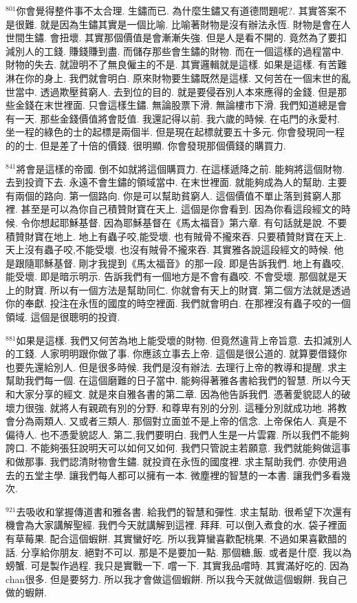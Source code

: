 \documentclass{book}
\begin{document}
$^{801}$你會覺得整件事不太合理.
生鏽而已.
為什麼生鏽又有道德問題呢?.
其實答案不是很難.
就是因為生鏽其實是一個比喻.
比喻著財物是沒有辦法永恆.
財物是會在人世間生鏽.
會扭壞.
其實那個價值是會漸漸失強.
但是人是看不開的.
竟然為了要扣減別人的工錢.
賺錢賺到盡.
而儲存那些會生鏽的財物.
而在一個這樣的過程當中.
財物的失去.
就證明不了無良僱主的不是.
其實邏輯就是這樣.
如果是這樣.
有苦難淋在你的身上.
我們就會明白.
原來財物要生鏽既然是這樣.
又何苦在一個末世的亂世當中.
透過欺壓貧窮人.
去到位的目的.
就是要侵吞別人本來應得的金錢.
但是那些金錢在末世裡面.
只會這樣生鏽.
無論股票下滑.
無論樓市下滑.
我們知道總是會有一天.
那些金錢價值將會貶值.
我還記得以前.
我六歲的時候.
在屯門的永愛村.
坐一程的綠色的士的起標是兩個半.
但是現在起標就要五十多元.
你會發現同一程的的士.
但是差了十倍的價錢.
很明顯.
你會發現那個價錢的購買力.

$^{841}$將會是這樣的帝國.
倒不如就將這個購買力.
在這樣遞降之前.
能夠將這個財物.
去到投資下去.
永遠不會生鏽的領域當中.
在末世裡面.
就能夠成為人的幫助.
主要有兩個的路向.
第一個路向.
你是可以幫助貧窮人.
這個價值不單止落到貧窮人那裡.
甚至是可以為你自己積贊財寶在天上.
這個是你會看到.
因為你看這段經文的時候.
令你想起耶穌基督.
因為耶穌基督在《馬太福音》第六章.
有句話就是說.
不要積贊財寶在地上.
地上有蟲子咬,能受壞.
也有賊骨不攏來吞.
只要積贊財寶在天上.
天上沒有蟲子咬,不能受壞.
也沒有賊骨不攏來吞.
其實雅各說這段經文的時候.
他是跟隨耶穌基督.
剛才我提到《馬太福音》的那一段.
即是告訴我們.
地上有蟲咬,能受壞.
即是暗示明示.
告訴我們有一個地方是不會有蟲咬.
不會受壞.
那個就是天上的財寶.
所以有一個方法是幫助同仁.
你就會有天上的財寶.
第二個方法就是透過你的奉獻.
投注在永恆的國度的時空裡面.
我們就會明白.
在那裡沒有蟲子咬的一個領域.
這個是很聰明的投資.

$^{881}$如果是這樣.
我們又何苦為地上能受壞的財物.
但竟然違背上帝旨意.
去扣減別人的工錢.
人家明明跟你做了事.
你應該立事去上帝.
這個是很公道的.
就算要借錢你也要先還給別人.
但是很多時候.
我們是沒有辦法.
去理行上帝的教導和提醒.
求主幫助我們每一個.
在這個磨難的日子當中.
能夠得著雅各書給我們的智慧.
所以今天和大家分享的經文.
就是來自雅各書的第二章.
因為他告訴我們.
憑著愛貌認人的破壞力很強.
就將人有親疏有別的分野.
和尊卑有別的分別.
這種分別就成功地.
將教會分為兩類人.
又或者三類人.
那個對立面並不是上帝的信念.
上帝保佑人.
真是不偏待人.
也不憑愛貌認人.
第二,我們要明白.
我們人生是一片雲霧.
所以我們不能夠誇口.
不能夠張狂說明天可以如何又如何.
我們只管說主若願意.
我們就能夠做這事和做那事.
我們認清財物會生鏽.
就投資在永恆的國度裡.
求主幫助我們.
亦使用過去的五堂主學.
讓我們每人都可以擁有一本.
微塵裡的智慧的一本書.
讓我們多看幾次.

$^{921}$去吸收和掌握傳道書和雅各書.
給我們的智慧和彈性.
求主幫助.
很希望下次還有機會為大家講解聖經.
我們今天就講解到這裡.
拜拜.
可以倒入煮食的水.
袋子裡面有草莓果.
配合這個蝦餅.
其實蠻好吃.
所以我算蠻喜歡配桃果.
不過如果喜歡醋的話.
分享給你朋友.
絕對不可以.
那是不是要加一點.
那個糖,飯.
或者是什麼.
我以為螃蟹.
可是製作過程.
我只是實戰一下.
嚐一下.
其實我品嚐時.
其實滿好吃的.
因為chan很多.
但是要努力.
所以我才會做這個蝦餅.
所以我今天就做這個蝦餅.
我自己做的蝦餅.
\newpage
\end{document}
